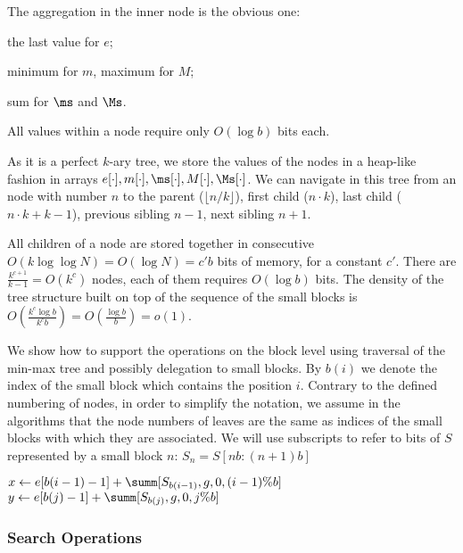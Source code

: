 The aggregation in the inner node is the obvious one:
\begin{iteminline}
	\item the last value for $e$;
	\item minimum for $m$, maximum for $M$;
	\item sum for $\ms$ and $\Ms$.
\end{iteminline}
All values within a node require only $O(\log b)$ bits each.

As it is a perfect $k$-ary tree, we store the values of the nodes in a heap-like fashion in arrays $e[\cdot], m[\cdot], \ms[\cdot], M[\cdot], \Ms[\cdot]$.
We can navigate in this tree from an node with number $n$ to the parent ($\lfloor n / k \rfloor$), first child ($n \cdot k$), last child ($n \cdot k + k - 1$), previous sibling $n - 1$, next sibling $n + 1$.

All children of a node are stored together in consecutive $O(k \log \log N) = O(\log N) = c' b$ bits of memory, for a constant $c'$.
There are $\frac{k^{c + 1}}{k - 1} = O(k^c)$ nodes, each of them requires $O(\log b)$ bits.
The density of the tree structure built on top of the sequence of the small blocks is $O\left(\frac{k^c \log b}{k^c b}\right) = O\left(\frac{\log b}{b}\right) = o(1)$.

\bigskip

We show how to support the operations on the block level using traversal of the min-max tree and possibly delegation to small blocks.
By $b(i)$ we denote the index of the small block which contains the position $i$.
Contrary to the defined numbering of nodes, in order to simplify the notation, we assume in the algorithms that the node numbers of leaves are the same as indices of the small blocks with which they are associated.
We will use subscripts to refer to bits of $S$ represented by a small block $n$: $S_n = S[n b : (n + 1) b]$

\begin{algorithm}
\begin{algorithmic}
	\State $x \gets e[b(i - 1) - 1] + \summ[S_{b(i - 1)}, g, 0, (i - 1) \% b]$
	\State $y \gets e[b(j) - 1] + \summ[S_{b(j)}, g, 0, j \% b]$
	\State {}
\EndFunction
\end{algorithmic}
\end{algorithm}

\subsubsection{Search Operations}

